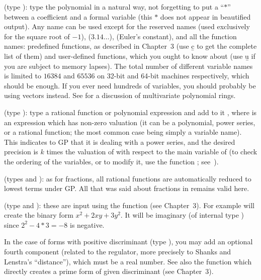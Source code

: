 \label{se:pol}
(type ): type the polynomial in a natural way, not
forgetting to put a ``$*$'' between a coefficient and a formal variable
(this $*$ does not appear in beautified output). Any  name
can be used except for the reserved names  (used exclusively for the
square root of $-1$),  ($3.14\dots$),  (Euler's
constant), and all the function names: predefined functions, as described
in Chapter~3 (use \b{c} to get the complete list of them) and user-defined
functions, which you ought to know about (use \b{u} if you are subject to
memory lapses). The total number of different variable names is limited to
$16384$ and $65536$ on 32-bit and 64-bit machines respectively, which
should be enough. If you ever need hundreds of variables, you should
probably be using vectors instead. See  for a discussion 
of multivariate polynomial rings.

\label{se:series}
(type ): type a rational function or
polynomial expression and add to it \hbox{},
where  is an expression which has non-zero valuation (it can be a
polynomial, power series, or a rational function; the most common case being
simply a variable name).
This indicates to GP that it is dealing with a power series, and the desired
precision is $k$ times the valuation of  with respect to the
main variable of  (to check the ordering of the variables, or
to modify it, use the function ; see~).

(types  and ): as for fractions, all rational
functions are automatically reduced to lowest terms under GP. All that was
said about fractions in  remains valid here.

%
(type  and ):
these are input using the function  (see Chapter~3). For example
 will create the binary form $x^2+2xy+3y^2$. It will be
imaginary (of internal type ) since $2^2 - 4*3 = -8$ is negative.

In the case of forms with positive discriminant (type ), you
may add an optional fourth component (related to the regulator, more
precisely to Shanks and Lenstra's ``distance''), which must be a real number.
See also the function  which directly creates a prime form
of given discriminant (see Chapter~3).

